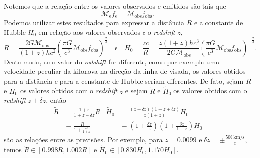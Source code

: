 Notemos que a relação entre os valores observados e emitidos são tais que
\begin{equation*}
    \mathcal{M}_\mathrm{e} f_\mathrm{e} = \mathcal{M}_\mathrm{obs} f_\mathrm{obs}.
\end{equation*}
Podemos utilizar estes resultados para expressar a distância \(R\) e a constante de Hubble \(H_0\) em relação aos valores observados e o \emph{redshift} \(z\),
\begin{equation*}
    R = \frac{2G\mathcal{M}_\mathrm{obs}}{(1+z) hc^2}\left(\frac{\pi G}{c^3}\mathcal{M}_\mathrm{obs} f_\mathrm{obs}\right)^\frac23\quad\text{e}\quad
    H_0 = \frac{zc}{R} = \frac{z(1+z)h c^3}{2G \mathcal{M}_\mathrm{obs}}\left(\frac{\pi G}{c^3} \mathcal{M}_\mathrm{obs} f_\mathrm{obs}\right)^{-\frac23}.
\end{equation*}
Deste modo, se o valor do \emph{redshift} for diferente, como por exemplo uma velocidade peculiar da kilonova na direção da linha de visada, os valores obtidos para a distância e para a constante de Hubble seriam diferentes. De fato, sejam \(R\) e \(H_0\) os valores obtidos com o \emph{redshift} \(z\) e sejam \(\tilde{R}\) e \(\tilde{H}_0\) os valores obtidos com o \emph{redshift} \(z + \delta z\), então
\begin{align*}
    \tilde{R} &= \frac{1 + z}{1 + z + \delta z} R&
    \tilde{H}_0 &= \frac{(z + \delta z)(1 + z + \delta z)}{z(1 + z)}H_0\\
                &= \frac{R}{1 + \frac{\delta z}{1+z}}&
                &= \left(1 + \frac{\delta z}{z}\right)\left(1 + \frac{\delta z}{1+z}\right) H_0
\end{align*}
são as relações entre as previsões. Por exemplo, para \(z = 0.0099\) e \(\delta z = \pm\frac{\SI{500}{\kilo\meter\per\second}}{c}\), temos \(\tilde{R} \in [0.998 R, 1.002 R]\) e \(\tilde{H}_0 \in [0.830H_0,1.170 H_0]\).

